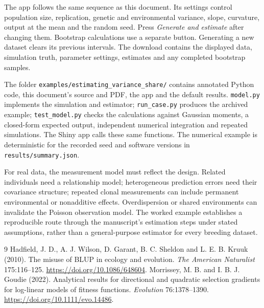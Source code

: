 \documentclass[11pt]{article}
\begin{document}
The app follows the same sequence as this document. Its settings control population size, replication, genetic and environmental variance, slope, curvature, output at the mean and the random seed. Press \emph{Generate and estimate} after changing them. Bootstrap calculations use a separate button. Generating a new dataset clears its previous intervals. The download contains the displayed data, simulation truth, parameter settings, estimates and any completed bootstrap samples.

The folder \texttt{examples/estimating\_variance\_share/} contains annotated Python code, this document's source and PDF, the app and the default results. \texttt{model.py} implements the simulation and estimator; \texttt{run\_case.py} produces the archived example; \texttt{test\_model.py} checks the calculations against Gaussian moments, a closed-form expected output, independent numerical integration and repeated simulations. The Shiny app calls these same functions. The numerical example is deterministic for the recorded seed and software versions in \texttt{results/summary.json}.

For real data, the measurement model must reflect the design. Related individuals need a relationship model; heterogeneous prediction errors need their covariance structure; repeated clonal measurements can include permanent environmental or nonadditive effects. Overdispersion or shared environments can invalidate the Poisson observation model. The worked example establishes a reproducible route through the manuscript's estimation steps under stated assumptions, rather than a general-purpose estimator for every breeding dataset.

\begin{thebibliography}{9}
 Hadfield, J. D., A. J. Wilson, D. Garant, B. C. Sheldon and L. E. B. Kruuk (2010). The misuse of BLUP in ecology and evolution. \emph{The American Naturalist} 175:116--125. \url{https://doi.org/10.1086/648604}.
 Morrissey, M. B. and I. B. J. Goudie (2022). Analytical results for directional and quadratic selection gradients for log-linear models of fitness functions. \emph{Evolution} 76:1378--1390. \url{https://doi.org/10.1111/evo.14486}.
\end{thebibliography}
\end{document}
